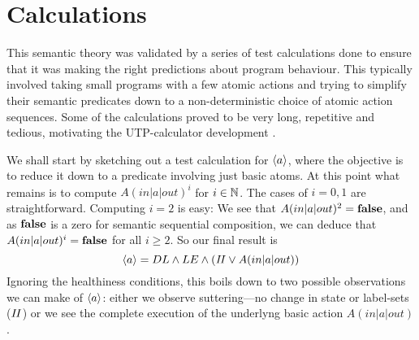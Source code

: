 \section{Calculations}\label{sec:calc}

This semantic theory was validated by a series of test calculations
done to ensure that it was making the right predictions about program behaviour.
This typically involved taking small programs with a few atomic actions
and trying to simplify their semantic predicates
down to a non-deterministic choice of atomic action sequences.
Some of the calculations proved to be very long,
repetitive and tedious,
motivating the UTP-calculator development \cite{DBLP:conf/utp/Butterfield16}.

We shall start by sketching out a test calculation for $\langle a\rangle$,
where the objective is to reduce it down to a predicate involving
just basic atoms.
At this point what remains is to compute $A(in|a|out)^i$ for $i \in \mathbb{N}$.
The cases of $i=0,1$ are straightforward.
Computing $i=2$ is easy:
We see that $A(in|a|out)^2 = \mathbf{false}$, and as $\mathbf{false}$ is a zero for
semantic sequential composition,
we can deduce that $A(in|a|out)^i = \mathbf{false}$ for all $i \geq 2$.
So our final result is
\begin{equation}
  \langle a\rangle = DL \land LE \land(\mathit{II} \lor A(in|a|out))
\end{equation}
Ignoring the healthiness conditions,
this boils down to two possible observations we can make of $\langle a\rangle$:
either we observe suttering---no change in state or label-sets ($\mathit{II}$)
or we see the complete execution of the underlyng basic action $A(in|a|out)$.

